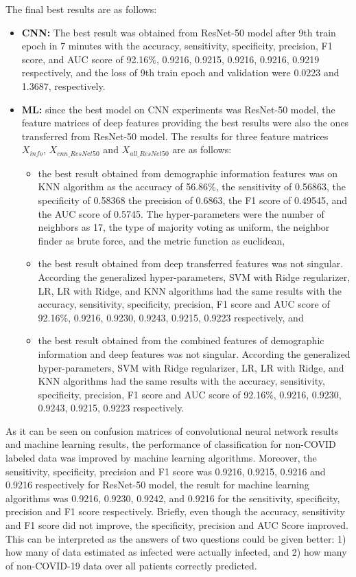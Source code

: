The final best results are as follows:
\begin{itemize}
    \item \textbf{CNN:} The best result was obtained from ResNet-50 model after 9th train epoch in 7 minutes with the accuracy, sensitivity, specificity, precision, F1 score, and AUC score of 92.16\%, 0.9216, 0.9215, 0.9216, 0.9216, 0.9219 respectively, and the loss of 9th train epoch and validation were 0.0223 and 1.3687, respectively.
    \item \textbf{ML:} since the best model on CNN experiments was ResNet-50 model, the feature matrices of deep features providing the best results were also the ones transferred from ResNet-50 model. The results for three feature matrices $X_{info}$, $X_{cnn\_ResNet50}$ and $X_{all\_ResNet50}$ are as follows:
    \begin{itemize}
        \item the best result obtained from demographic information features was on KNN algorithm as the accuracy of 56.86\%, the sensitivity of 0.56863, the specificity of 0.58368 the precision of 0.6863, the F1 score of 0.49545, and the AUC score of 0.5745. The hyper-parameters were the number of neighbors as 17, the type of majority voting as uniform, the neighbor finder as brute force, and the metric function as euclidean,
        \item the best result obtained from deep transferred features was not singular. According the generalized hyper-parameters, SVM with Ridge regularizer, LR, LR with Ridge, and KNN algorithms had the same results with the accuracy, sensitivity, specificity, precision, F1 score and AUC score of 92.16\%, 0.9216, 0.9230, 0.9243, 0.9215, 0.9223 respectively, and
        \item the best result obtained from the combined features of demographic information and deep features was not singular. According the generalized hyper-parameters, SVM with Ridge regularizer, LR, LR with Ridge, and KNN algorithms had the same results with the accuracy, sensitivity, specificity, precision, F1 score and AUC score of 92.16\%, 0.9216, 0.9230, 0.9243, 0.9215, 0.9223 respectively.
    \end{itemize}
\end{itemize}

As it can be seen on confusion matrices of convolutional neural network results and machine learning results, the performance of classification for non-COVID labeled data was improved by machine learning algorithms. Moreover, the sensitivity, specificity, precision and F1 score was 0.9216, 0.9215, 0.9216 and 0.9216 respectively for ResNet-50 model, the result for machine learning algorithms was 0.9216, 0.9230, 0.9242, and 0.9216 for the sensitivity, specificity, precision and F1 score respectively. Briefly, even though the accuracy, sensitivity and F1 score did not improve, the specificity, precision and AUC Score improved. This can be interpreted as the answers of two questions could be given better: 1) how many of data estimated as infected were actually infected, and 2) how many of non-COVID-19 data over all patients correctly predicted.


